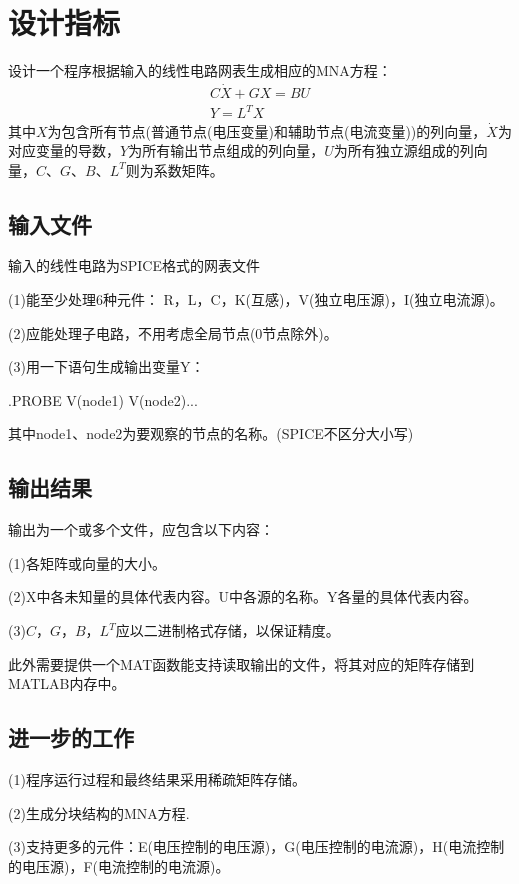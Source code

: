 \documentclass[12pt]{article}
\begin{document}
\begin{spacing}{1.2}
  \tableofcontents
\end{spacing}
\newpage


\section{设计指标}
\qquad 设计一个程序根据输入的线性电路网表生成相应的MNA方程：
\begin{gather*}
C \dot{X}+G X=B U \\
Y=L^T X 
\end{gather*}
\quad 其中$X$为包含所有节点(普通节点(电压变量)和辅助节点(电流变量))的列向量，$\dot{X}$为对应变量的导数，$Y$为所有输出节点组成的列向量，$U$为所有独立源组成的列向量，$C、G、B、L^T$则为系数矩阵。\par
\subsection{输入文件}
\qquad 输入的线性电路为SPICE格式的网表文件 \par
\qquad (1)能至少处理6种元件： R，L，C，K(互感)，V(独立电压源)，I(独立电流源)。 \par
\qquad (2)应能处理子电路，不用考虑全局节点(0节点除外)。 \par
\qquad (3)用一下语句生成输出变量Y： \par
\qquad \qquad .PROBE V(node1) V(node2)... \par
\qquad 其中node1、node2为要观察的节点的名称。(SPICE不区分大小写)

\subsection{输出结果}
\qquad 输出为一个或多个文件，应包含以下内容：\par
\qquad (1)各矩阵或向量的大小。\par
\qquad (2)X中各未知量的具体代表内容。U中各源的名称。Y各量的具体代表内容。\par
\qquad (3)$C，G，B，L^T$应以二进制格式存储，以保证精度。\par
\qquad 此外需要提供一个MAT函数能支持读取输出的文件，将其对应的矩阵存储到MATLAB内存中。\par

\subsection{进一步的工作}
\qquad (1)程序运行过程和最终结果采用稀疏矩阵存储。\par
\qquad (2)生成分块结构的MNA方程.\par
\qquad (3)支持更多的元件：E(电压控制的电压源)，G(电压控制的电流源)，H(电流控制的电压源)，F(电流控制的电流源)。\par
\end{document}
